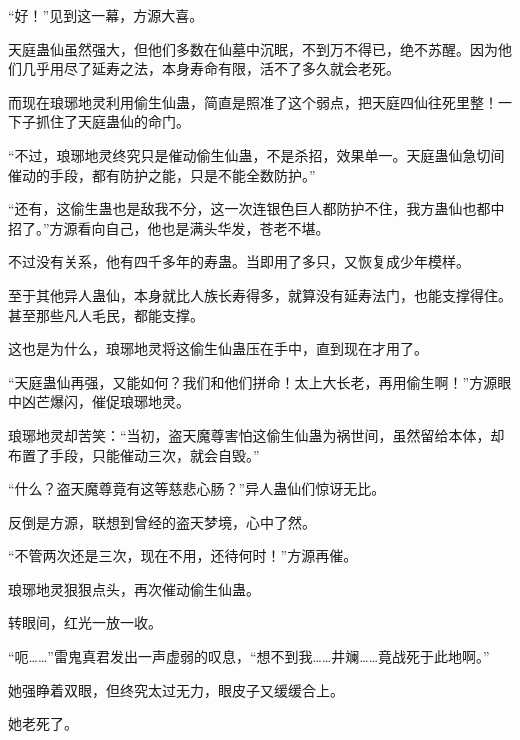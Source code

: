 \begin{this_body}
“好！”见到这一幕，方源大喜。

天庭蛊仙虽然强大，但他们多数在仙墓中沉眠，不到万不得已，绝不苏醒。因为他们几乎用尽了延寿之法，本身寿命有限，活不了多久就会老死。

而现在琅琊地灵利用偷生仙蛊，简直是照准了这个弱点，把天庭四仙往死里整！一下子抓住了天庭蛊仙的命门。

“不过，琅琊地灵终究只是催动偷生仙蛊，不是杀招，效果单一。天庭蛊仙急切间催动的手段，都有防护之能，只是不能全数防护。”

“还有，这偷生蛊也是敌我不分，这一次连银色巨人都防护不住，我方蛊仙也都中招了。”方源看向自己，他也是满头华发，苍老不堪。

不过没有关系，他有四千多年的寿蛊。当即用了多只，又恢复成少年模样。

至于其他异人蛊仙，本身就比人族长寿得多，就算没有延寿法门，也能支撑得住。甚至那些凡人毛民，都能支撑。

这也是为什么，琅琊地灵将这偷生仙蛊压在手中，直到现在才用了。

“天庭蛊仙再强，又能如何？我们和他们拼命！太上大长老，再用偷生啊！”方源眼中凶芒爆闪，催促琅琊地灵。

琅琊地灵却苦笑：“当初，盗天魔尊害怕这偷生仙蛊为祸世间，虽然留给本体，却布置了手段，只能催动三次，就会自毁。”

“什么？盗天魔尊竟有这等慈悲心肠？”异人蛊仙们惊讶无比。

反倒是方源，联想到曾经的盗天梦境，心中了然。

“不管两次还是三次，现在不用，还待何时！”方源再催。

琅琊地灵狠狠点头，再次催动偷生仙蛊。

转眼间，红光一放一收。

“呃……”雷鬼真君发出一声虚弱的叹息，“想不到我……井斓……竟战死于此地啊。”

她强睁着双眼，但终究太过无力，眼皮子又缓缓合上。

她老死了。

\end{this_body}

